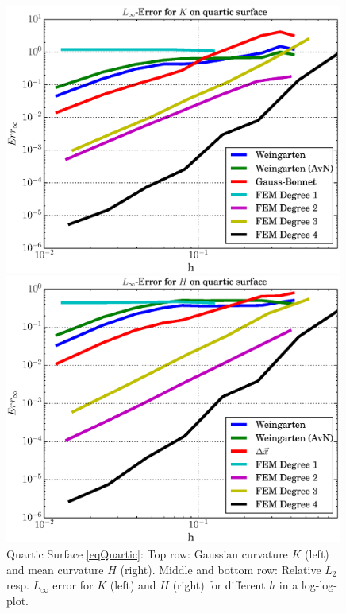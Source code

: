 \begin{figure}
\begin{minipage}[htp]{.23\textwidth}
      \centering
      \includegraphics[width=0.99\textwidth]{bilder/quartic/LMaxK.eps}
    \end{minipage}\hfill
    \begin{minipage}[htp]{.23\textwidth}
      \centering
      \includegraphics[width=0.99\textwidth]{bilder/quartic/LMaxH.eps}
    \end{minipage}
    \caption{Quartic Surface \eqref{eqQuartic}: Top row: Gaussian curvature \( K \) (left) and mean curvature \( H \) (right).
                              Middle and bottom row: Relative \( L_{2} \) resp. \( L_{\infty} \) error for \( K \) (left) and
                                                     \( H \) (right) for different \( h \) in a log-log-plot.}
    \label{figQuartic}
  \end{figure}

